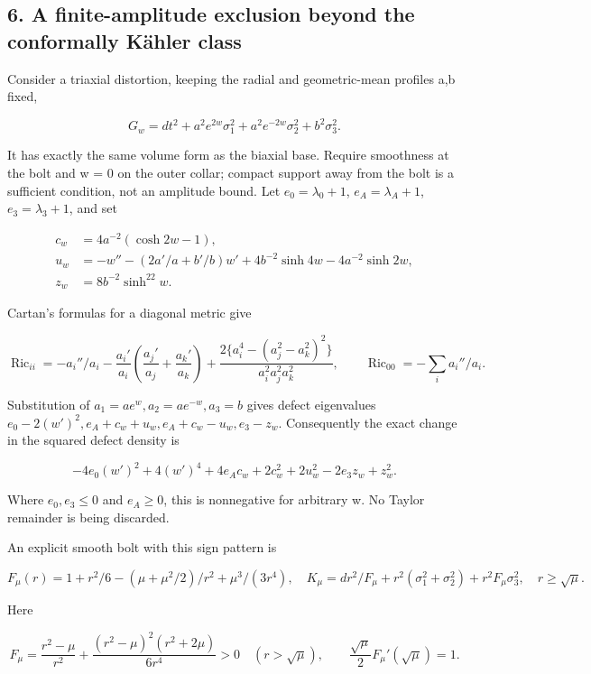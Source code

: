 \documentclass[
  10pt,
]{article}
\begin{document}
\hypertarget{a-finite-amplitude-exclusion-beyond-the-conformally-kuxe4hler-class}{%
\subsection{6. A finite-amplitude exclusion beyond the conformally
Kähler
class}\label{a-finite-amplitude-exclusion-beyond-the-conformally-kuxe4hler-class}}

Consider a triaxial distortion, keeping the radial and geometric-mean
profiles a,b fixed,

\[
 G_w=dt^2+a^2e^{2w}\sigma_1^2+a^2e^{-2w}\sigma_2^2+b^2\sigma_3^2.
\]

It has exactly the same volume form as the biaxial base. Require
smoothness at the bolt and w = 0 on the outer collar; compact support
away from the bolt is a sufficient condition, not an amplitude bound.
Let \(e_0=\lambda_0+1\), \(e_A=\lambda_A+1\), \(e_3=\lambda_3+1\), and
set

\[
\begin{aligned}
 c_w&=4a^{-2}(\cosh 2w-1),\\
 u_w&=-w''-(2a'/a+b'/b)w'+4b^{-2}\sinh4w-4a^{-2}\sinh2w,\\
 z_w&=8b^{-2}\sinh^22w.
\end{aligned}
\]

Cartan's formulas for a diagonal metric give

\[
 \operatorname{Ric}_{ii}=-a_i''/a_i
 -\frac{a_i'}{a_i}\left(\frac{a_j'}{a_j}+\frac{a_k'}{a_k}\right)
 +\frac{2\{a_i^4-(a_j^2-a_k^2)^2\}}{a_i^2a_j^2a_k^2},
 \qquad \operatorname{Ric}_{00}=-\sum_i a_i''/a_i.
\]

Substitution of \(a_1=ae^w,a_2=ae^{-w},a_3=b\) gives defect eigenvalues
\(e_0-2(w')^2,e_A+c_w+u_w,e_A+c_w-u_w,e_3-z_w\). Consequently the exact
change in the squared defect density is

\[
 \boxed{-4e_0(w')^2+4(w')^4+4e_Ac_w+2c_w^2+2u_w^2
                         -2e_3z_w+z_w^2.}                       \tag{6.1}
\]

Where \(e_0,e_3\le0\) and \(e_A\ge0\), this is nonnegative for arbitrary
w. No Taylor remainder is being discarded.

An explicit smooth bolt with this sign pattern is

\[
 F_\mu(r)=1+r^2/6-(\mu+\mu^2/2)/r^2+\mu^3/(3r^4),
 \quad K_\mu=dr^2/F_\mu+r^2(\sigma_1^2+\sigma_2^2)
                         +r^2F_\mu\sigma_3^2,\quad r\ge\sqrt\mu.
\]

Here

\[
 F_\mu=\frac{r^2-\mu}{r^2}
       +\frac{(r^2-\mu)^2(r^2+2\mu)}{6r^4}>0\quad(r>\sqrt\mu),
 \qquad \frac{\sqrt\mu}{2}F_\mu'(\sqrt\mu)=1.
\]
\end{document}

